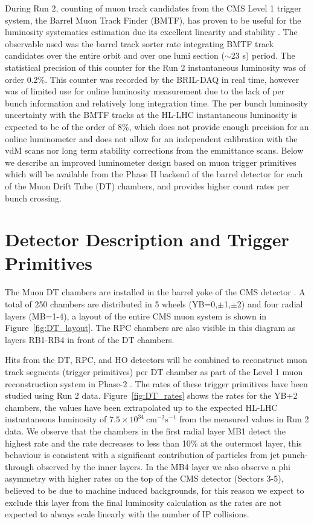 During Run 2, counting of muon track candidates from the CMS Level 1 trigger system, the Barrel Muon Track Finder (BMTF),
has proven to be useful for the luminosity systematics estimation due its excellent linearity and stability \cite{LUM-17-001}.
The observable used was the barrel track sorter rate integrating BMTF track candidates
 over the entire orbit and over one lumi section ($\sim$23 s) period.
The statistical precision of this counter for the Run 2 instantaneous luminosity was of order 0.2\%.
This counter was recorded by the BRIL-DAQ in real time,
however was of limited use for online luminosity measurement due to the
lack of per bunch information and relatively long integration time.
The per bunch luminosity uncertainty with the BMTF tracks at the HL-LHC instantaneous luminosity is expected to be of the order of 8\%,
which does not provide enough precision for an online luminometer and does not allow for an independent calibration
with the vdM scans nor long term stability corrections from the emmittance scans.
Below we describe an improved luminometer design based on muon trigger primitives which will be available 
from the Phase II backend of the  barrel detector for each of the Muon Drift Tube (DT) chambers,
and provides higher count rates per bunch crossing.


\section{Detector Description and Trigger Primitives}

The Muon DT chambers are installed in the barrel yoke of the CMS detector \cite{DT-2009}.
A total of 250 chambers are distributed in 5 wheels (YB=0,$\pm$1,$\pm$2) and four radial layers (MB=1-4),
a layout of the entire  CMS muon system is shown in Figure~\ref{fig:DT_layout}.
The RPC chambers are also visible in this diagram as layers RB1-RB4 in front of the DT chambers.

Hits from the DT, RPC, and HO detectors will be combined to reconstruct muon track segments (trigger primitives) per DT chamber as part of the  Level 1 muon reconstruction system in Phase-2 \cite{CERN-LHCC-2017-012}.
The rates of these trigger primitives have been studied using Run 2 data.
Figure~\ref{fig:DT_rates} shows the rates for the YB+2  chambers,
the values have been extrapolated up to the expected HL-LHC instantaneous luminosity of  $7.5\times10^{34}\ \text{cm}^{-2}\text{s}^{-1}$ from the measured values in Run 2 data.
We observe that the chambers in the first radial layer MB1 detect the highest rate
and the rate decreases to less than 10\% at the outermost layer,
this behaviour is consistent with a significant contribution of particles from jet punch-through observed by the inner layers.
In the MB4 layer we also observe a phi asymmetry with higher rates on the top of the CMS detector (Sectors 3-5), believed to be due to machine induced backgrounds,
for this reason we expect to exclude this layer from the final luminosity calculation as the rates are not expected to always scale linearly with the number of IP collisions. 


